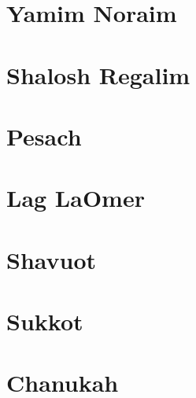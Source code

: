 \documentclass[letterpaper]{memoir}
\newcommand{\song}[2]{}
\begin{document}
\chapter{Yamim Noraim}
\song{Lecha Eli}{Lecha_Eli.pdf}

\chapter{Shalosh Regalim}
\song{Mauzi}{Mauzi.pdf}
\song{Samachti Tehillim 122}{Samachti.pdf}
\song{B'tzeit Yisrael}{Btzeit_Yisrael.pdf}
\song{Aromimcha}{Aromimcha.pdf}

\chapter{Pesach}
\song{Yachid Norah}{Yachid_Norah.pdf}
\song{Rachum Atah}{Rachum_Atah.pdf}
\song{B'neh Li Zevul Mishkani}{Bneh_Li_Zevul_Mishkani.pdf}
\song{Emunim Irchu Shevach (Yerushalmi)}{Emunim_Irchu_Shevach_Yerushalyim.pdf}
\song{Emunim Irchu Shevach (Syrian)}{Emunim_Irchu_Shevach_Syrian.pdf}
\song{Mi Yimalel Gevurotecha}{Mi_Yimalel_Gevurotecha.pdf}
\song{El B'Yado}{El_BYado.pdf}
\song{El B'Yado \#2}{El_BYado_2.pdf}
\song{El Maleh HaNechsar}{El_Maleh_HaNechsar.pdf}
\song{Ashir laEl Ga'oh Ga'ah}{Ashir_laEl_Gaoh_Gaah.pdf}

\chapter{Lag LaOmer}
\song{V'amartem Ko Lachai}{Vamartem_Ko_Lachai.pdf}

\chapter{Shavuot}
\song{Roe' Ne'eman Hu}{Roe_Neeman_Hu.pdf}
\song{Da'at Umzimah}{Daat_Umzimah.pdf}

\chapter{Sukkot}
\song{Sukkah v'Lulav (Moroccan)}{Sukkah_vLulav_Moroccan.pdf}
\song{Sukkah v'Lulav (Yerushalmi)}{Sukkah_vLulav_Yerushalmi.pdf}
\song{Sukkah v'Lulav (Iraqi)}{Sukkah_vLulav_Iraqi.pdf}
\song{Chanun Rachem}{Chanun_Rachem.pdf}
\song{Yah Et Sukkat David Takim}{Yah_Et_Sukkat_David_Takim.pdf}
\song{Nizke l'kol Berachot (Iraqi)}{Nizke_lkol_Berachot_Bavel.pdf}
\song{Nizke l'kol Berachot}{Nizke_lkol_Berachot.pdf}

\chapter{Chanukah}
\song{Yah Hatzel Yonah}{Yah_Hatzel_Yonah.pdf}
\song{Heichalo Heichalo}{Heichalo_Heichalo.pdf}
\song{L'neri}{Lneri.pdf}
\song{Am Ne'emanai}{Am_Neemanai.pdf}
\end{document}

